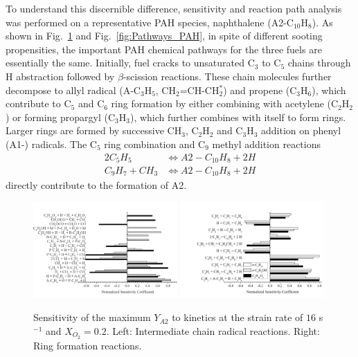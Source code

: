 \documentclass[review,3p,times]{elsarticleUS}
\begin{document}
To understand this discernible difference, sensitivity and reaction path analysis was performed on a representative PAH species, naphthalene (A2-C$_{10}$H$_8$). As shown in Fig.~\ref{fig:SA4} and Fig.~\ref{fig:Pathways_PAH}, in spite of different sooting propensities, the important PAH chemical pathways for the three fuels are essentially the same. Initially, fuel cracks to unsaturated C$_3$ to C$_5$ chains through H abstraction followed by $\beta$-scission reactions. These chain molecules further decompose to allyl radical (A-C$_3$H$_5$, CH$_2$=CH-CH$_2^*$) and propene (C$_3$H$_6$), which contribute to C$_5$ and C$_6$ ring formation by either combining with acetylene (C$_2$H$_2$) or forming propargyl (C$_3$H$_3$), which further combines with itself to form rings. Larger rings are formed by successive CH$_3$, C$_2$H$_2$ and C$_3$H$_3$ addition on phenyl (A1-) radicals. The C$_5$ ring combination and C$_9$ methyl addition reactions
\begin{align*}
  2 C_5H_5 &\Longleftrightarrow A2-C_{10}H_8 + 2 H\\
  C_9H_7 + CH_3 &\Longleftrightarrow A2-C_{10}H_8 + 2 H
\end{align*}
directly contribute to the formation of A2. 

\begin{figure}[ht]
  \centering
  \scriptsize
  \includegraphics[trim=0mm 0mm 0mm 8mm, clip=true,width=0.49\textwidth]{Chain.png}
  \includegraphics[trim=0mm 0mm 0mm 8mm, clip=true,width=0.49\textwidth]{Ring.png}
  \normalsize
  \vspace{-0.2in}
  \caption{Sensitivity of the maximum $Y_{A2}$ to kinetics at the strain rate of $16$ s$^{-1}$ and $X_{O_2}=0.2$. Left: Intermediate chain radical reactions. Right: Ring formation reactions.}
  \label{fig:SA4}
\end{figure}
\end{document}
